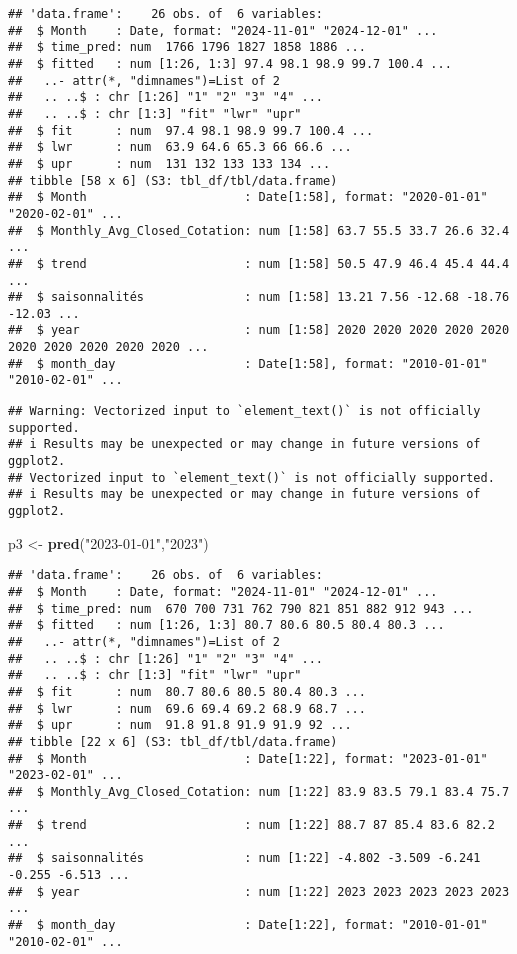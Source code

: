 \documentclass[
]{article}
\newenvironment{Shaded}{\begin{snugshade}}{\end{snugshade}}
\newcommand{\FunctionTok}[1]{\textcolor[rgb]{0.13,0.29,0.53}{\textbf{#1}}}
\newcommand{\NormalTok}[1]{#1}
\newcommand{\OtherTok}[1]{\textcolor[rgb]{0.56,0.35,0.01}{#1}}
\newcommand{\StringTok}[1]{\textcolor[rgb]{0.31,0.60,0.02}{#1}}
\begin{document}
\begin{verbatim}
## 'data.frame':    26 obs. of  6 variables:
##  $ Month    : Date, format: "2024-11-01" "2024-12-01" ...
##  $ time_pred: num  1766 1796 1827 1858 1886 ...
##  $ fitted   : num [1:26, 1:3] 97.4 98.1 98.9 99.7 100.4 ...
##   ..- attr(*, "dimnames")=List of 2
##   .. ..$ : chr [1:26] "1" "2" "3" "4" ...
##   .. ..$ : chr [1:3] "fit" "lwr" "upr"
##  $ fit      : num  97.4 98.1 98.9 99.7 100.4 ...
##  $ lwr      : num  63.9 64.6 65.3 66 66.6 ...
##  $ upr      : num  131 132 133 133 134 ...
## tibble [58 x 6] (S3: tbl_df/tbl/data.frame)
##  $ Month                      : Date[1:58], format: "2020-01-01" "2020-02-01" ...
##  $ Monthly_Avg_Closed_Cotation: num [1:58] 63.7 55.5 33.7 26.6 32.4 ...
##  $ trend                      : num [1:58] 50.5 47.9 46.4 45.4 44.4 ...
##  $ saisonnalités              : num [1:58] 13.21 7.56 -12.68 -18.76 -12.03 ...
##  $ year                       : num [1:58] 2020 2020 2020 2020 2020 2020 2020 2020 2020 2020 ...
##  $ month_day                  : Date[1:58], format: "2010-01-01" "2010-02-01" ...
\end{verbatim}

\begin{verbatim}
## Warning: Vectorized input to `element_text()` is not officially supported.
## i Results may be unexpected or may change in future versions of ggplot2.
## Vectorized input to `element_text()` is not officially supported.
## i Results may be unexpected or may change in future versions of ggplot2.
\end{verbatim}

\begin{Shaded}
\begin{Highlighting}[]
\NormalTok{p3 }\OtherTok{\textless{}{-}} \FunctionTok{pred}\NormalTok{(}\StringTok{"2023{-}01{-}01"}\NormalTok{,}\StringTok{"2023"}\NormalTok{) }
\end{Highlighting}
\end{Shaded}

\begin{verbatim}
## 'data.frame':    26 obs. of  6 variables:
##  $ Month    : Date, format: "2024-11-01" "2024-12-01" ...
##  $ time_pred: num  670 700 731 762 790 821 851 882 912 943 ...
##  $ fitted   : num [1:26, 1:3] 80.7 80.6 80.5 80.4 80.3 ...
##   ..- attr(*, "dimnames")=List of 2
##   .. ..$ : chr [1:26] "1" "2" "3" "4" ...
##   .. ..$ : chr [1:3] "fit" "lwr" "upr"
##  $ fit      : num  80.7 80.6 80.5 80.4 80.3 ...
##  $ lwr      : num  69.6 69.4 69.2 68.9 68.7 ...
##  $ upr      : num  91.8 91.8 91.9 91.9 92 ...
## tibble [22 x 6] (S3: tbl_df/tbl/data.frame)
##  $ Month                      : Date[1:22], format: "2023-01-01" "2023-02-01" ...
##  $ Monthly_Avg_Closed_Cotation: num [1:22] 83.9 83.5 79.1 83.4 75.7 ...
##  $ trend                      : num [1:22] 88.7 87 85.4 83.6 82.2 ...
##  $ saisonnalités              : num [1:22] -4.802 -3.509 -6.241 -0.255 -6.513 ...
##  $ year                       : num [1:22] 2023 2023 2023 2023 2023 ...
##  $ month_day                  : Date[1:22], format: "2010-01-01" "2010-02-01" ...
\end{verbatim}
\end{document}

